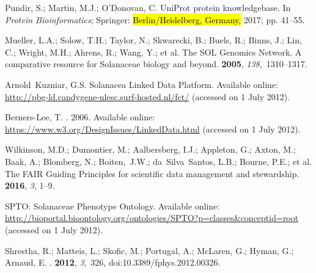 \documentclass[applsci,article,accept,moreauthors,pdftex]{Definitions/mdpi}
\begin{document}
{\begin{thebibliography}{999}
{
Pundir, S.; Martin, M.J.; O’Donovan, C.
\newblock UniProt protein knowledgebase. In {\em Protein Bioinformatics};
  Springer:  \hl{Berlin/Heidelberg, Germany,} %
  2017; pp. 41--55.

Mueller, L.A.; Solow, T.H.; Taylor, N.; Skwarecki, B.; Buels, R.; Binns, J.;
  Lin, C.; Wright, M.H.; Ahrens, R.; Wang, Y.; et al.
\newblock The SOL Genomics Network. A comparative resource for Solanaceae
  biology and beyond.
 {\bf 2005}, {\em 138},~1310--1317.

Arnold~Kuzniar, G.S.
\newblock Solanacea Linked Data Platform.
\newblock Available online: \url{http://pbg-ld.candygene-nlesc.surf-hosted.nl/fct/}
\newblock  (accessed on 1 July 2012).

Berners-Lee, T.
. 2006.
\newblock Available online: \url{https://www.w3.org/DesignIssues/LinkedData.html}
\newblock (accessed on 1 July 2012).

Wilkinson, M.D.; Dumontier, M.; Aalbersberg, I.J.; Appleton, G.; Axton, M.;
  Baak, A.; Blomberg, N.; Boiten,~J.W.; da~Silva~Santos, L.B.; Bourne, P.E.;
  et al.
\newblock The FAIR Guiding Principles for scientific data management and
  stewardship.
 {\bf 2016}, {\em 3}, 1--9.

SPTO: Solanaceae Phenotype Ontology.
\newblock
 Available online:  \url{http://bioportal.bioontology.org/ontologies/SPTO?p=classes&conceptid=root}
\newblock (accessed on 1 July 2012).

Shrestha, R.; Matteis, L.; Skofic, M.; Portugal, A.; McLaren, G.; Hyman, G.;
  Arnaud, E.
.
 {\bf 2012}, {\em 3},~326, doi:10.3389/fphys.2012.00326.

}
\end{thebibliography}}
\end{document}
